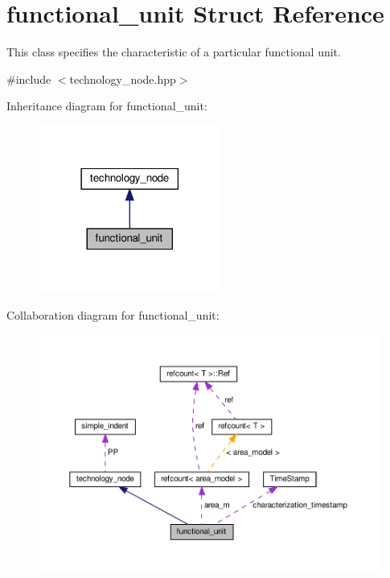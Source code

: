 \hypertarget{structfunctional__unit}{}\section{functional\+\_\+unit Struct Reference}
\label{structfunctional__unit}


This class specifies the characteristic of a particular functional unit.  




{\ttfamily \#include $<$technology\+\_\+node.\+hpp$>$}



Inheritance diagram for functional\+\_\+unit\+:
\nopagebreak
\begin{figure}[H]
\begin{center}
\leavevmode
\includegraphics[width=170pt]{d4/d3e/structfunctional__unit__inherit__graph}
\end{center}
\end{figure}


Collaboration diagram for functional\+\_\+unit\+:
\nopagebreak
\begin{figure}[H]
\begin{center}
\leavevmode
\includegraphics[width=350pt]{d1/d92/structfunctional__unit__coll__graph}
\end{center}
\end{figure}
